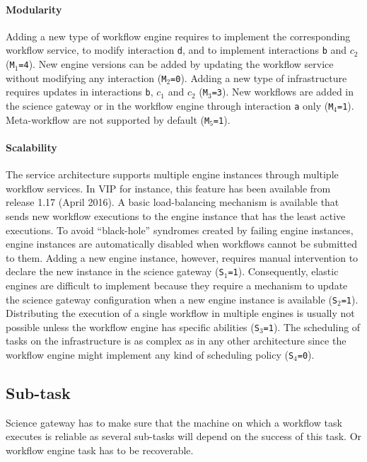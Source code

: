 \documentclass[preprint,3p,twocolumn]{elsarticle}
\begin{document}
\paragraph{Modularity} Adding a new type of workflow engine requires
to implement the corresponding workflow service, to modify interaction
\texttt{d}, and to implement interactions \texttt{b} and
\texttt{$c_2$} (\texttt{M$_1$=4}). New engine versions can be added by
updating the workflow service without modifying any interaction
(\texttt{M$_2$=0}). Adding a new type of infrastructure requires
updates in interactions \texttt{b}, \texttt{$c_1$} and \texttt{$c_2$}
(\texttt{M$_3$=3}). New workflows are added in the science gateway or
in the workflow engine through interaction \texttt{a} only
(\texttt{M$_4$=1}). Meta-workflow are not supported by default
(\texttt{M$_5$=1}).

\paragraph{Scalability} The service architecture supports multiple
engine instances through multiple workflow services. In VIP for
instance, this feature has been available from release 1.17 (April
2016). A basic load-balancing mechanism is available that sends new
workflow executions to the engine instance that has the least active
executions. To avoid ``black-hole'' syndromes created by failing
engine instances, engine instances are automatically disabled when
workflows cannot be submitted to them. Adding a new engine instance,
however, requires manual intervention to declare the new instance in
the science gateway (\texttt{S$_1$=1}). Consequently, elastic engines
are difficult to implement because they require a mechanism to update
the science gateway configuration when a new engine instance is
available (\texttt{S$_2$=1}). Distributing the execution of a single
workflow in multiple engines is usually not possible unless the
workflow engine has specific abilities (\texttt{S$_3$=1}). The
scheduling of tasks on the infrastructure is as complex as in any
other architecture since the workflow engine might implement any kind
of scheduling policy (\texttt{S$_4$=0}).

\subsection{Sub-task}

Science gateway has to make sure that the machine on which a workflow
task executes is reliable as several sub-tasks will depend on the
success of this task. Or workflow engine task has to be recoverable.
\end{document}
